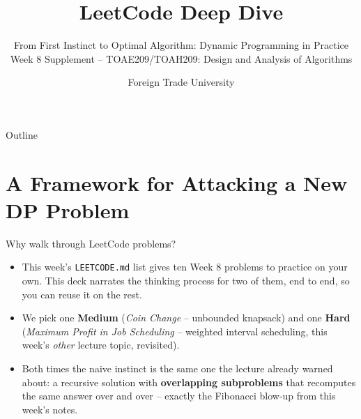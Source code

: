\documentclass[11pt,aspectratio=169]{beamer}
\title{LeetCode Deep Dive}
\subtitle{From First Instinct to Optimal Algorithm: Dynamic Programming in Practice\\
\small Week 8 Supplement -- TOAE209/TOAH209: Design and Analysis of Algorithms}
\author{Foreign Trade University}
\date{}
\begin{document}
\begin{frame}
  \titlepage
\end{frame}

\begin{frame}{Outline}
  \tableofcontents
\end{frame}

\section{A Framework for Attacking a New DP Problem}

\begin{frame}{Why walk through LeetCode problems?}
  \begin{itemize}
    \item This week's \texttt{LEETCODE.md} list gives ten Week 8 problems to practice
    on your own. This deck narrates the thinking process for two of them, end to end,
    so you can reuse it on the rest.
    \item We pick one \textcolor{blue!50!black}{\textbf{Medium}} (\emph{Coin Change} --
    unbounded knapsack) and one \textcolor{red!60!black}{\textbf{Hard}} (\emph{Maximum
    Profit in Job Scheduling} -- weighted interval scheduling, this week's \emph{other}
    lecture topic, revisited).
    \item Both times the naive instinct is the same one the lecture already warned
    about: a recursive solution with \textbf{overlapping subproblems} that recomputes
    the same answer over and over -- exactly the Fibonacci blow-up from this week's
    notes.
  \end{itemize}
\end{frame}
\end{document}
